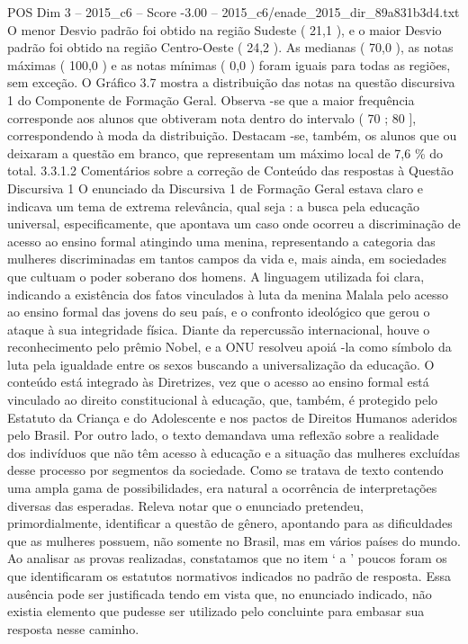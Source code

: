 \begin{textsample}{POS Dim 3 – 2015\_c6 – Score -3.00 – 2015\_c6/enade\_2015\_dir\_89a831b3d4.txt}
O menor Desvio padrão foi obtido na região Sudeste ( 21,1 ), e o maior Desvio padrão foi obtido na região Centro-Oeste ( 24,2 ).
As medianas ( 70,0 ), as notas máximas ( 100,0 ) e as notas mínimas ( 0,0 ) foram iguais para todas as regiões, sem exceção.
O Gráfico 3.7 mostra a distribuição das notas na questão discursiva 1 do Componente de Formação Geral.
Observa -se que a maior frequência corresponde aos alunos que obtiveram nota dentro do intervalo ( 70 ; 80 ], correspondendo à moda da distribuição.
Destacam -se, também, os alunos que ou deixaram a questão em branco, que representam um máximo local de 7,6 \% do total. 3.3.1.2 Comentários sobre a correção de Conteúdo das respostas à Questão Discursiva 1 O enunciado da Discursiva 1 de Formação Geral estava claro e indicava um tema de extrema relevância, qual seja : a busca pela educação universal, especificamente, que apontava um caso onde ocorreu a discriminação de acesso ao ensino formal atingindo uma menina, representando a categoria das mulheres discriminadas em tantos campos da vida e, mais ainda, em sociedades que cultuam o poder soberano dos homens.
A linguagem utilizada foi clara, indicando a existência dos fatos vinculados à luta da menina Malala pelo acesso ao ensino formal das jovens do seu país, e o confronto ideológico que gerou o ataque à sua integridade física.
Diante da repercussão internacional, houve o reconhecimento pelo prêmio Nobel, e a ONU resolveu apoiá -la como símbolo da luta pela igualdade entre os sexos buscando a universalização da educação.
O conteúdo está integrado às Diretrizes, vez que o acesso ao ensino formal está vinculado ao direito constitucional à educação, que, também, é protegido pelo Estatuto da Criança e do Adolescente e nos pactos de Direitos Humanos aderidos pelo Brasil.
Por outro lado, o texto demandava uma reflexão sobre a realidade dos indivíduos que não têm acesso à educação e a situação das mulheres excluídas desse processo por segmentos da sociedade.
Como se tratava de texto contendo uma ampla gama de possibilidades, era natural a ocorrência de interpretações diversas das esperadas.
Releva notar que o enunciado pretendeu, primordialmente, identificar a questão de gênero, apontando para as dificuldades que as mulheres possuem, não somente no Brasil, mas em vários países do mundo.
Ao analisar as provas realizadas, constatamos que no item ‘ a ’ poucos foram os que identificaram os estatutos normativos indicados no padrão de resposta.
Essa ausência pode ser justificada tendo em vista que, no enunciado indicado, não existia elemento que pudesse ser utilizado pelo concluinte para embasar sua resposta nesse caminho.

\end{textsample}
